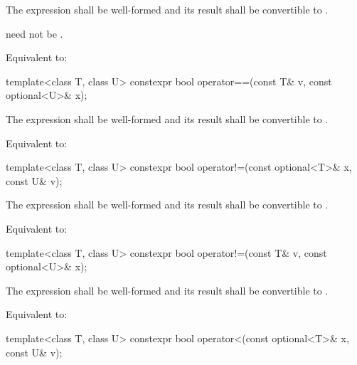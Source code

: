\begin{itemdescr}
\pnum
\requires
The expression  shall be well-formed and
its result shall be convertible to .
\begin{note}
 need not be .
\end{note}

\pnum
\effects
Equivalent to: 
\end{itemdescr}

%
\begin{itemdecl}
template<class T, class U> constexpr bool operator==(const T& v, const optional<U>& x);
\end{itemdecl}

\begin{itemdescr}
\pnum
\requires
The expression  shall be well-formed and
its result shall be convertible to .

\pnum
\effects
Equivalent to: 
\end{itemdescr}

%
\begin{itemdecl}
template<class T, class U> constexpr bool operator!=(const optional<T>& x, const U& v);
\end{itemdecl}

\begin{itemdescr}
\pnum
\requires
The expression  shall be well-formed and
its result shall be convertible to .

\pnum
\effects
Equivalent to: 
\end{itemdescr}

%
\begin{itemdecl}
template<class T, class U> constexpr bool operator!=(const T& v, const optional<U>& x);
\end{itemdecl}

\begin{itemdescr}
\pnum
\requires
The expression  shall be well-formed and
its result shall be convertible to .

\pnum
\effects
Equivalent to: 
\end{itemdescr}

%
\begin{itemdecl}
template<class T, class U> constexpr bool operator<(const optional<T>& x, const U& v);
\end{itemdecl}

